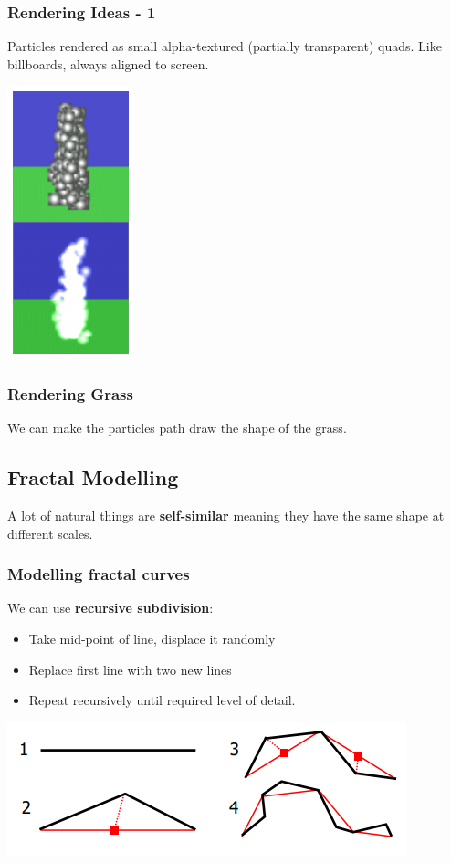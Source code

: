 \documentclass[11pt]{article}
\begin{document}
  \subsubsection{Rendering Ideas - 1}
  Particles rendered as small alpha-textured (partially transparent) quads. Like billboards, always aligned to screen.
  \begin{center}
    \includegraphics[scale=0.7]{render4}
  \end{center}

  \subsubsection{Rendering Grass}
  We can make the particles path draw the shape of the grass.


  \subsection{Fractal Modelling}
  A lot of natural things are \textbf{self-similar} meaning they have the same shape at different scales.

  \subsubsection{Modelling fractal curves}
  We can use \textbf{recursive subdivision}:
  \begin{itemize}
    \item Take mid-point of line, displace it randomly
    \item Replace first line with two new lines
    \item Repeat recursively until required level of detail.

  \end{itemize}
  \begin{center}
    \includegraphics{recursive_subdivision}
  \end{center}
\end{document}
